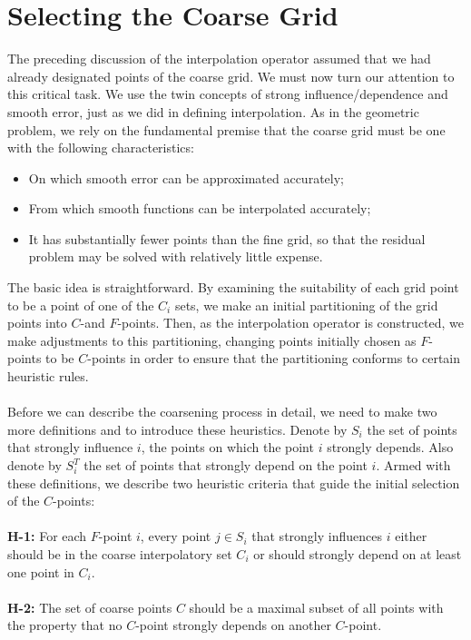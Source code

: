 \documentclass[11pt]{book}
\begin{document}
\section*{Selecting the Coarse Grid}
The preceding discussion of the interpolation operator assumed that we had already designated points of the coarse grid. We must now turn our attention to this critical task. We use the twin concepts of strong influence/dependence and smooth error, just as we did in defining interpolation. As in the geometric problem, we rely on the fundamental premise that the coarse grid must be one with the following characteristics:
\begin{itemize}
  \item On which smooth error can be approximated accurately;

  \item From which smooth functions can be interpolated accurately;

  \item It has substantially fewer points than the fine grid, so that the residual problem may be solved with relatively little expense. 
\end{itemize}
The basic idea is straightforward. By examining the suitability of each grid point to be a point of one of the $C_{i}$ sets, we make an initial partitioning of the grid points into $C$-and $F$-points. Then, as the interpolation operator is constructed, we make adjustments to this partitioning, changing points initially chosen as $F$-points to be $C$-points in order to ensure that the partitioning conforms to certain heuristic rules.\\ \\
Before we can describe the coarsening process in detail, we need to make two more definitions and to introduce these heuristics. Denote by $S_{i}$ the set of points that strongly influence $i$, the points on which the point $i$ strongly depends. Also denote by $S_{i}^{T}$ the set of points that strongly depend on the point $i$. Armed with these definitions, we describe two heuristic criteria that guide the initial selection of the $C$-points:\\ \\
\textbf{H-1:} For each $F$-point $i$, every point $j \in S_{i}$ that strongly influences $i$ either should be in the coarse interpolatory set $C_{i}$ or should strongly depend on at least one point in $C_{i}$.\\ \\
\textbf{H-2:} The set of coarse points $C$ should be a maximal subset of all points with the property that no $C$-point strongly depends on another $C$-point. \\ \\
\end{document}

